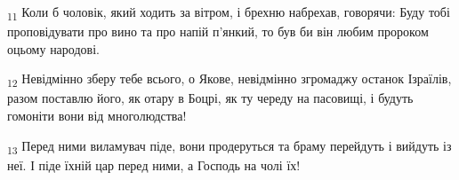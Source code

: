 \begin{tcolorbox}
\textsubscript{11} Коли б чоловік, який ходить за вітром, і брехню набрехав, говорячи: Буду тобі проповідувати про вино та про напій п'янкий, то був би він любим пророком оцьому народові.
\end{tcolorbox}
\begin{tcolorbox}
\textsubscript{12} Невідмінно зберу тебе всього, о Якове, невідмінно згромаджу останок Ізраїлів, разом поставлю його, як отару в Боцрі, як ту череду на пасовищі, і будуть гомоніти вони від многолюдства!
\end{tcolorbox}
\begin{tcolorbox}
\textsubscript{13} Перед ними виламувач піде, вони продеруться та браму перейдуть і вийдуть із неї. І піде їхній цар перед ними, а Господь на чолі їх!
\end{tcolorbox}

